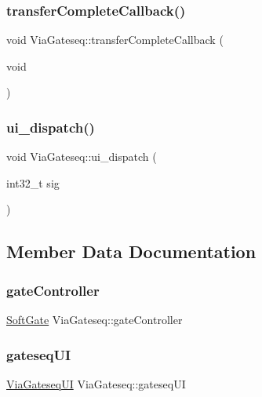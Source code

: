 \subsubsection{\texorpdfstring{transfer\+Complete\+Callback()}{transferCompleteCallback()}}
{\footnotesize\ttfamily void Via\+Gateseq\+::transfer\+Complete\+Callback (\begin{DoxyParamCaption}\item[{void}]{ }\end{DoxyParamCaption})}

\mbox{\label{class_via_gateseq_aaca5689865a460afca19c9b73e67e236}} 
\subsubsection{\texorpdfstring{ui\+\_\+dispatch()}{ui\_dispatch()}}
{\footnotesize\ttfamily void Via\+Gateseq\+::ui\+\_\+dispatch (\begin{DoxyParamCaption}\item[{int32\+\_\+t}]{sig }\end{DoxyParamCaption})\hspace{0.3cm}{\ttfamily [inline]}}



\subsection{Member Data Documentation}
\mbox{\label{class_via_gateseq_a07aca8cb788a3452736e585b82fd6826}} 
\subsubsection{\texorpdfstring{gate\+Controller}{gateController}}
{\footnotesize\ttfamily \mbox{\hyperlink{class_soft_gate}{Soft\+Gate}} Via\+Gateseq\+::gate\+Controller}

\mbox{\label{class_via_gateseq_ae55cb2ce39ea0d6d614cd43f287f1151}} 
\subsubsection{\texorpdfstring{gateseq\+UI}{gateseqUI}}
{\footnotesize\ttfamily \mbox{\hyperlink{class_via_gateseq_1_1_via_gateseq_u_i}{Via\+Gateseq\+UI}} Via\+Gateseq\+::gateseq\+UI}

